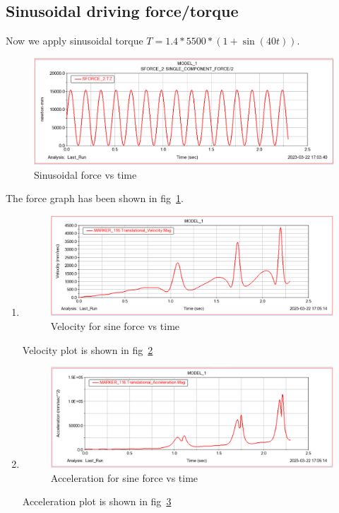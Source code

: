    \subsection{Sinusoidal driving force/torque}
        Now we apply sinusoidal torque $T = 1.4*5500*(1+\sin(40t))$.
        \begin{figure}[hbt!]
            \centering
            \includegraphics[width=0.9\columnwidth]{Images/Force_sinusoidal.png}
            \caption{Sinusoidal force vs time}
            \label{fig:sin_force}
        \end{figure}
        The force graph has been shown in fig~\ref{fig:sin_force}.
        \begin{enumerate}
            \item 
                \begin{figure}[hbt!]
                    \centering
                    \includegraphics[width=0.9\columnwidth]{Images/sine_vel.png}
                    \caption{Velocity for sine force vs time}
                    \label{fig:sine_vel}
                \end{figure}
                Velocity plot is shown in fig~\ref{fig:sine_vel}
            \item 
                \begin{figure}[hbt!]
                    \centering
                    \includegraphics[width=0.9\columnwidth]{Images/sine_acc.png}
                    \caption{Acceleration for sine force vs time}
                    \label{fig:sine_acc}
                \end{figure}
                Acceleration plot is shown in fig~\ref{fig:sine_acc}
        \end{enumerate}